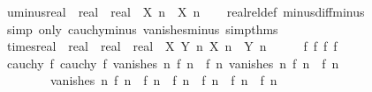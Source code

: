 \begin{isabellebody}
\isanewline
{}\isamarkupfalse%
\ uminus{\isacharunderscore}{\kern0pt}real\ {\isacharcolon}{\kern0pt}{\isacharcolon}{\kern0pt}\ {\isachardoublequoteopen}real\ {\isasymRightarrow}\ real{\isachardoublequoteclose}\ \ {\isachardoublequoteopen}{\isasymlambda}X\ n{\isachardot}{\kern0pt}\ {\isacharminus}{\kern0pt}\ X\ n{\isachardoublequoteclose}\isanewline
%
\isadelimproof
\ \ %
\endisadelimproof
%
\isatagproof
{}\isamarkupfalse%
\ realrel{\isacharunderscore}{\kern0pt}def\ minus{\isacharunderscore}{\kern0pt}diff{\isacharunderscore}{\kern0pt}minus\isanewline
\ \ \isamarkupfalse%
\ {\isacharparenleft}{\kern0pt}simp\ only{\isacharcolon}{\kern0pt}\ cauchy{\isacharunderscore}{\kern0pt}minus\ vanishes{\isacharunderscore}{\kern0pt}minus\ simp{\isacharunderscore}{\kern0pt}thms{\isacharparenright}{\kern0pt}%
\endisatagproof
{\isafoldproof}%
%
\isadelimproof
\isanewline
%
\endisadelimproof
\isanewline
{}\isamarkupfalse%
\ times{\isacharunderscore}{\kern0pt}real\ {\isacharcolon}{\kern0pt}{\isacharcolon}{\kern0pt}\ {\isachardoublequoteopen}real\ {\isasymRightarrow}\ real\ {\isasymRightarrow}\ real{\isachardoublequoteclose}\ \ {\isachardoublequoteopen}{\isasymlambda}X\ Y\ n{\isachardot}{\kern0pt}\ X\ n\ {\isacharasterisk}{\kern0pt}\ Y\ n{\isachardoublequoteclose}\isanewline
%
\isadelimproof
%
\endisadelimproof
%
\isatagproof
{}\isamarkupfalse%
\ {\isacharminus}{\kern0pt}\isanewline
\ \ \isamarkupfalse%
\ f{}\ f{}\ f{}\ f{}\isanewline
\ \ \isamarkupfalse%
\ {\isachardoublequoteopen}{\isasymlbrakk}cauchy\ f{}{\isacharsemicolon}{\kern0pt}\ cauchy\ f{}{\isacharsemicolon}{\kern0pt}\ vanishes\ {\isacharparenleft}{\kern0pt}{\isasymlambda}n{\isachardot}{\kern0pt}\ f{}\ n\ {\isacharminus}{\kern0pt}\ f{}\ n{\isacharparenright}{\kern0pt}{\isacharsemicolon}{\kern0pt}\ vanishes\ {\isacharparenleft}{\kern0pt}{\isasymlambda}n{\isachardot}{\kern0pt}\ f{}\ n\ {\isacharminus}{\kern0pt}\ f{}\ n{\isacharparenright}{\kern0pt}{\isasymrbrakk}\isanewline
\ \ \ \ \ \ \ {\isasymLongrightarrow}\ vanishes\ {\isacharparenleft}{\kern0pt}{\isasymlambda}n{\isachardot}{\kern0pt}\ f{}\ n\ {\isacharasterisk}{\kern0pt}\ {\isacharparenleft}{\kern0pt}f{}\ n\ {\isacharminus}{\kern0pt}\ f{}\ n{\isacharparenright}{\kern0pt}\ {\isacharplus}{\kern0pt}\ f{}\ n\ {\isacharasterisk}{\kern0pt}\ {\isacharparenleft}{\kern0pt}f{}\ n\ {\isacharminus}{\kern0pt}\ f{}\ n{\isacharparenright}{\kern0pt}{\isacharparenright}{\kern0pt}{\isachardoublequoteclose}\isanewline

\end{isabellebody}
